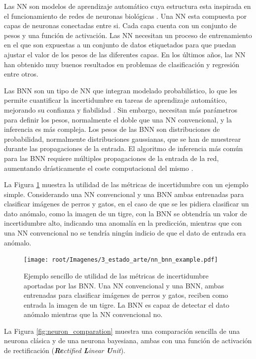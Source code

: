 Las NN son modelos de aprendizaje automático cuya estructura esta inspirada en el funcionamiento de redes de neuronas biológicas \cite{deep_learning_nature}. Una NN esta compuesta por capas de neuronas conectadas entre si. Cada capa cuenta con un conjunto de pesos y una función de activación. Las NN necesitan un proceso de entrenamiento en el que son expuestas a un conjunto de datos etiquetados para que puedan ajustar el valor de los pesos de las diferentes capas. En los últimos años, las NN han obtenido muy buenos resultados en problemas de clasificación y regresión entre otros.

Las BNN son un tipo de NN que integran modelado probabilístico, lo que les permite cuantificar la incertidumbre en tareas de aprendizaje automático, mejorando su confianza y fiabilidad \cite{bnn_hyper_uncertainty}. Sin embargo, necesitan más parámetros para definir los pesos, normalmente el doble que una NN convencional, y la inferencia es más compleja. Los pesos de las BNN son distribuciones de probabilidad, normalmente distribuciones gaussianas, que se han de muestrear durante las propagaciones de la entrada. El algoritmo de inferencia más común para las BNN requiere múltiples propagaciones de la entrada de la red, aumentando drásticamente el coste computacional del mismo \cite{bnn_theory_paper}. 

La Figura \ref{fig:bnn_vs_nn_example} muestra la utilidad de las métricas de incertidumbre con un ejemplo simple. Considerando una NN convencional y una BNN ambas entrenadas para clasificar imágenes de perros y gatos, en el caso de que se les pidiera clasificar un dato anómalo, como la imagen de un tigre, con la BNN se obtendría un valor de incertidumbre alto, indicando una anomalía en la predicción, mientras que con una NN convencional no se tendría ningún indicio de que el dato de entrada era anómalo.

\begin{figure}[h]
    \centering
    \texttt{[image: root/Imagenes/3\_estado\_arte/nn\_bnn\_example.pdf]}
    \caption{Ejemplo sencillo de utilidad de las métricas de incertidumbre aportadas por las BNN. Una NN convencional y una BNN, ambas entrenadas para clasificar imágenes de perros y gatos, reciben como entrada la imagen de un tigre. La BNN es capaz de detectar el dato anómalo mientras que la NN convencional no.}
    \label{fig:bnn_vs_nn_example}
\end{figure}

La Figura \ref{fig:neuron_comparation} muestra una comparación sencilla de una neurona clásica y de una neurona bayesiana, ambas con una función de activación de rectificación (\textit{\textbf{Re}ctified \textbf{L}inear \textbf{U}nit}).

